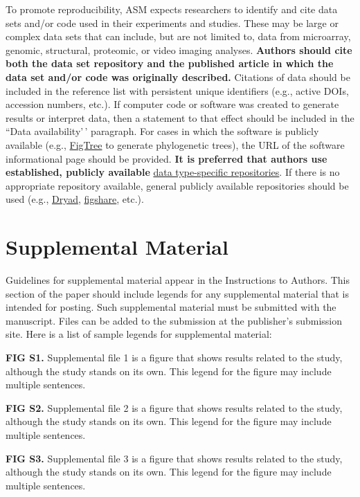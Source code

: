 \documentclass[
  lineno]{asm}
\begin{document}
To promote reproducibility, ASM expects researchers to identify and cite
data sets and/or code used in their experiments and studies. These may
be large or complex data sets that can include, but are not limited to,
data from microarray, genomic, structural, proteomic, or video imaging
analyses. \textbf{Authors should cite both the data set repository and
the published article in which the data set and/or code was originally
described.} Citations of data should be included in the reference list
with persistent unique identifiers (e.g., active DOIs, accession
numbers, etc.). If computer code or software was created to generate
results or interpret data, then a statement to that effect should be
included in the ``Data availability'\,' paragraph. For cases in which
the software is publicly available (e.g.,
\href{http://tree.bio.ed.ac.uk/software/figtree/}{FigTree} to generate
phylogenetic trees), the URL of the software informational page should
be provided. \textbf{It is preferred that authors use established,
publicly available}
\href{https://journals.asm.org/list-data-repositories}{data type-specific repositories}.
If there is no appropriate repository available, general publicly
available repositories should be used (e.g.,
\href{https://datadryad.org/stash}{Dryad},
\href{https://figshare.com/}{figshare}, etc.).

\section{Supplemental Material}\label{supplemental-material}

Guidelines for supplemental material appear in the Instructions to
Authors. This section of the paper should include legends for any
supplemental material that is intended for posting. Such supplemental
material must be submitted with the manuscript. Files can be added to
the submission at the publisher's submission site. Here is a list of
sample legends for supplemental material:

\textbf{FIG S1.} Supplemental file 1 is a figure that shows results
related to the study, although the study stands on its own. This legend
for the figure may include multiple sentences.

\textbf{FIG S2.} Supplemental file 2 is a figure that shows results
related to the study, although the study stands on its own. This legend
for the figure may include multiple sentences.

\textbf{FIG S3.} Supplemental file 3 is a figure that shows results
related to the study, although the study stands on its own. This legend
for the figure may include multiple sentences.
\end{document}
